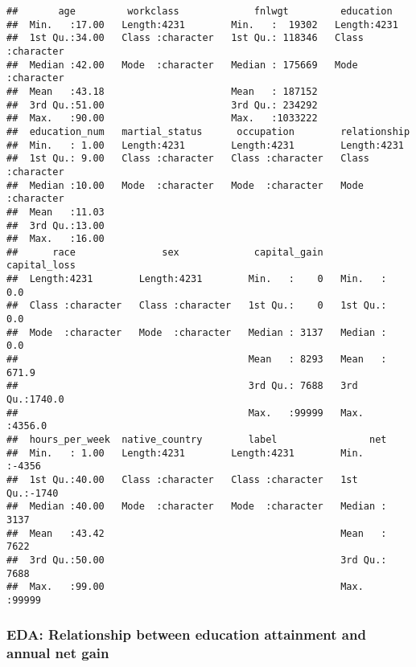 \documentclass[]{article}
\begin{document}
\begin{verbatim}
##       age         workclass             fnlwgt         education        
##  Min.   :17.00   Length:4231        Min.   :  19302   Length:4231       
##  1st Qu.:34.00   Class :character   1st Qu.: 118346   Class :character  
##  Median :42.00   Mode  :character   Median : 175669   Mode  :character  
##  Mean   :43.18                      Mean   : 187152                     
##  3rd Qu.:51.00                      3rd Qu.: 234292                     
##  Max.   :90.00                      Max.   :1033222                     
##  education_num   martial_status      occupation        relationship      
##  Min.   : 1.00   Length:4231        Length:4231        Length:4231       
##  1st Qu.: 9.00   Class :character   Class :character   Class :character  
##  Median :10.00   Mode  :character   Mode  :character   Mode  :character  
##  Mean   :11.03                                                           
##  3rd Qu.:13.00                                                           
##  Max.   :16.00                                                           
##      race               sex             capital_gain    capital_loss   
##  Length:4231        Length:4231        Min.   :    0   Min.   :   0.0  
##  Class :character   Class :character   1st Qu.:    0   1st Qu.:   0.0  
##  Mode  :character   Mode  :character   Median : 3137   Median :   0.0  
##                                        Mean   : 8293   Mean   : 671.9  
##                                        3rd Qu.: 7688   3rd Qu.:1740.0  
##                                        Max.   :99999   Max.   :4356.0  
##  hours_per_week  native_country        label                net       
##  Min.   : 1.00   Length:4231        Length:4231        Min.   :-4356  
##  1st Qu.:40.00   Class :character   Class :character   1st Qu.:-1740  
##  Median :40.00   Mode  :character   Mode  :character   Median : 3137  
##  Mean   :43.42                                         Mean   : 7622  
##  3rd Qu.:50.00                                         3rd Qu.: 7688  
##  Max.   :99.00                                         Max.   :99999
\end{verbatim}

\hypertarget{eda-relationship-between-education-attainment-and-annual-net-gain}{%
\subsubsection{EDA: Relationship between education attainment and annual
net
gain}\label{eda-relationship-between-education-attainment-and-annual-net-gain}}
\end{document}
